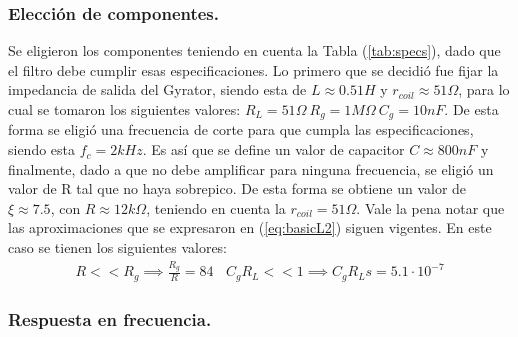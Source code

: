 \subsubsection{Elección de componentes.}
Se eligieron los componentes teniendo en cuenta la Tabla (\ref{tab:specs}), dado que el filtro debe cumplir esas especificaciones.
Lo primero que se decidió fue fijar la impedancia de salida del Gyrator, siendo esta de $L \approx 0.51H $ y $r_{coil} \approx 51\Omega $, para lo cual se tomaron los siguientes valores: $R_L = 51\Omega \ R_g = 1M\Omega \ C_g = 10nF$.
De esta forma se eligió una frecuencia de corte para que cumpla las especificaciones, siendo esta $f_c =2kHz $. Es así que se define un valor de capacitor $C \approx 800nF$ y finalmente, dado a que no debe amplificar para ninguna frecuencia, se eligió un valor de R tal que no haya sobrepico. De esta forma se obtiene un valor de $\xi \approx 7.5 $, con $R \approx 12k\Omega $, teniendo en cuenta la $r_{coil} = 51\Omega$.  
Vale la pena notar que las aproximaciones que se expresaron en (\ref{eq:basicL2}) siguen vigentes. En este caso se tienen los siguientes valores:
\begin{align}  R<<R_g \implies  \frac{R_g}{R}=  84 \ \ \ \ C_gR_L << 1 \implies C_gR_Ls =5.1\cdot 10^{-7}\end{align}



\subsubsection{Respuesta en frecuencia.}

